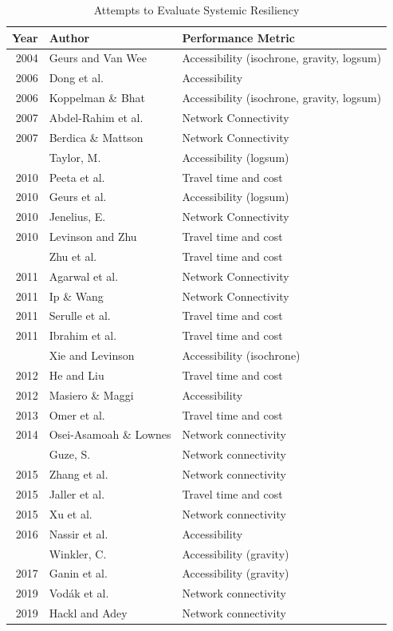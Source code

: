 \begin{table}

\caption{\label{tab:authortable}Attempts to Evaluate Systemic Resiliency}
\centering
\begin{tabular}[t]{rll}
\toprule
Year & Author & Performance Metric\\
\midrule
2004 & Geurs and Van Wee & Accessibility (isochrone, gravity, logsum)\\
2006 & Dong et al. & Accessibility\\
2006 & Koppelman \& Bhat & Accessibility (isochrone, gravity, logsum)\\
2007 & Abdel-Rahim et al. & Network Connectivity\\
2007 & Berdica \& Mattson & Network Connectivity\\
\addlinespace
2008 & Taylor, M. & Accessibility (logsum)\\
2010 & Peeta et al. & Travel time and cost\\
2010 & Geurs et al. & Accessibility (logsum)\\
2010 & Jenelius, E. & Network Connectivity\\
2010 & Levinson and Zhu & Travel time and cost\\
\addlinespace
2010 & Zhu et al. & Travel time and cost\\
2011 & Agarwal et al. & Network Connectivity\\
2011 & Ip \& Wang & Network Connectivity\\
2011 & Serulle et al. & Travel time and cost\\
2011 & Ibrahim et al. & Travel time and cost\\
\addlinespace
2011 & Xie and Levinson & Accessibility (isochrone)\\
2012 & He and Liu & Travel time and cost\\
2012 & Masiero \& Maggi & Accessibility \\
2013 & Omer et al. & Travel time and cost\\
2014 & Osei-Asamoah \& Lownes & Network connectivity\\
\addlinespace
2014 & Guze, S. & Network connectivity\\
2015 & Zhang et al. & Network connectivity\\
2015 & Jaller et al. & Travel time and cost\\
2015 & Xu et al. & Network connectivity\\
2016 & Nassir et al. & Accessibility \\
\addlinespace
2016 & Winkler, C. & Accessibility (gravity)\\
2017 & Ganin et al. & Accessibility (gravity)\\
2019 & Vodák et al. & Network connectivity\\
2019 & Hackl and Adey & Network connectivity\\
\bottomrule
\end{tabular}
\end{table}

